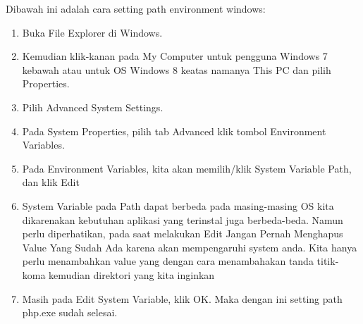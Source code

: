 Dibawah ini adalah cara setting path environment windows:
\begin{enumerate}[1.]
  \item Buka File Explorer di Windows.
  \item Kemudian klik-kanan pada My Computer untuk pengguna Windows 7 kebawah atau untuk OS Windows 8 keatas namanya This PC dan pilih Properties.
  \item Pilih Advanced System Settings.
  \item Pada System Properties, pilih tab Advanced klik tombol Environment Variables.
  \item Pada Environment Variables, kita akan memilih/klik System Variable Path, dan klik Edit
  \item System Variable pada Path dapat berbeda pada masing-masing OS kita dikarenakan kebutuhan aplikasi yang terinstal juga berbeda-beda. Namun perlu diperhatikan, pada saat melakukan Edit Jangan Pernah Menghapus Value Yang Sudah Ada karena akan mempengaruhi system anda. Kita hanya perlu menambahkan value yang dengan cara menambahakan tanda titik-koma kemudian direktori yang kita inginkan
  \item Masih pada Edit System Variable, klik OK. Maka dengan ini setting path php.exe sudah selesai.
\end{enumerate}









